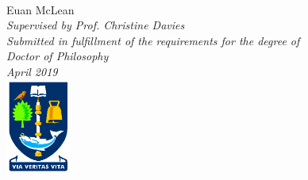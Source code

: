 \begin{titlepage}
\begin{center}
\vspace*{0.8cm}
 \\
\vspace*{0.5cm}
\noindent \LARGE Euan McLean \\
\vspace*{1.3cm}
\noindent \large \emph{Supervised by Prof. Christine Davies} \\
\vspace*{0.8cm}
\noindent \large \emph{Submitted in fulfillment of the requirements for the degree of} \\
\vspace*{0.1cm}
\noindent \large \emph{Doctor of Philosophy} \\
\vspace*{0.8cm}
\noindent \large \emph{April 2019} \\
\vspace*{1.3cm}
\includegraphics[width=80px]{images/logo-glasgow-small.png}

\vspace*{0.3cm}

 \\
 \\


\end{center}

\cleardoublepage




\end{titlepage}

